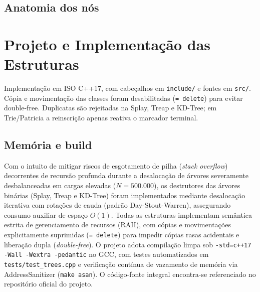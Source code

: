 \documentclass[11pt, a4paper]{article}
\begin{document}
\subsection{Anatomia dos nós}

\begin{table}[htbp]
\centering
\scriptsize
{}
\caption{Anatomia dos nós (arquitetura 64 bits).}
\label{tab:anatomia_nos}
\end{table}

\section{Projeto e Implementação das Estruturas}

Implementação em ISO C++17, com cabeçalhos em \texttt{include/} e fontes em \texttt{src/}. Cópia e movimentação das classes foram desabilitadas (\texttt{= delete}) para evitar double-free. Duplicatas são rejeitadas na Splay, Treap e KD-Tree; em Trie/Patricia a reinscrição apenas reativa o marcador terminal.

\subsection{Memória e build}

Com o intuito de mitigar riscos de esgotamento de pilha (\textit{stack overflow}) decorrentes de recursão profunda durante a desalocação de árvores severamente desbalanceadas em cargas elevadas ($N = 500.000$), os destrutores das árvores binárias (Splay, Treap e KD-Tree) foram implementados mediante desalocação iterativa com rotações de cauda (padrão Day-Stout-Warren), assegurando consumo auxiliar de espaço $O(1)$. Todas as estruturas implementam semântica estrita de gerenciamento de recursos (RAII), com cópias e movimentações explicitamente suprimidas (\texttt{= delete}) para impedir cópias rasas acidentais e liberação dupla (\textit{double-free}). O projeto adota compilação limpa sob \texttt{-std=c++17 -Wall -Wextra -pedantic} no GCC, com testes automatizados em \texttt{tests/test\_trees.cpp} e verificação contínua de vazamento de memória via AddressSanitizer (\texttt{make asan}). O código-fonte integral encontra-se referenciado no repositório oficial do projeto.
\end{document}
